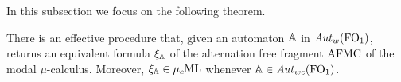 
%
%

In this subsection we focus on the following theorem.

\begin{theorem}\label{t:autofor}
There is an effective procedure that, given an automaton $\mathbb{A}$ in
$\mathit{Aut}_{w}(\mathrm{FO}_1)$, returns an equivalent formula $\xi_{\mathbb{A}}$ of the alternation free fragment 
$\mathrm{AFMC}$ of the modal $\mu$-calculus. Moreover, $\xi_{\mathbb{A}} \in \mu_{c}\mathrm{ML}$ whenever $\mathbb{A} \in \mathit{Aut}_{wc}(\mathrm{FO}_1)$.
\end{theorem}

